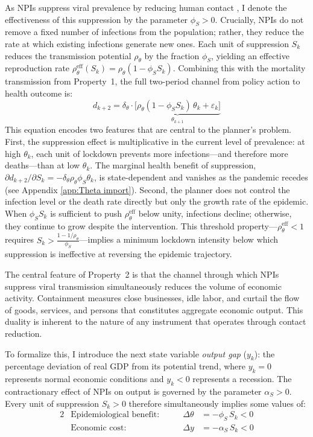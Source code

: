 \documentclass[12pt, a4paper]{article}
\newcommand{\Sk}{S_k}
\begin{document}
As NPIs suppress viral prevalence by reducing human contact \citep{Flaxman2020}, I denote the effectiveness of this suppression by the parameter $\phi_S > 0$. Crucially, NPIs do not remove a fixed number of infections from the population; rather, they reduce the rate at which existing infections generate new ones. Each unit of suppression $S_k$ reduces the transmission potential $\rho_\theta$ by the fraction $\phi_S$, yielding an effective reproduction rate $\rho_\theta^{\text{eff}}(S_k) = \rho_\theta(1 - \phi_S S_k)$. Combining this with the mortality transmission from Property~1, the full two-period channel from policy action to health outcome is:
%
\begin{equation}
    d_{k+2} = \delta_\theta \cdot \underbrace{\bigl[\rho_\theta (1 - \phi_S S_k) \, \theta_k + \varepsilon_k\bigr]}_{\theta_{k+1}} 
    \label{eq:excess dynamics}
\end{equation}
%
This equation encodes two features that are central to the planner's problem. First, the suppression effect is multiplicative in the current level of prevalence: at high $\theta_k$, each unit of lockdown prevents more infections---and therefore more deaths---than at low $\theta_k$. The marginal health benefit of suppression, $\partial d_{k+2} / \partial S_k = -\delta_\theta \rho_\theta \phi_S \theta_k$, is state-dependent and vanishes as the pandemic recedes (see Appendix \ref{app:Theta import}). Second, the planner does not control the infection level or the death rate directly but only the growth rate of the epidemic. When $\phi_S S_k$ is sufficient to push $\rho_\theta^{\text{eff}}$ below unity, infections decline; otherwise, they continue to grow despite the intervention. This threshold property---$\rho_\theta^{\text{eff}} < 1$ requires $S_k > \frac{1 - 1/\rho_\theta}{\phi_S}$---implies a minimum lockdown intensity below which suppression is ineffective at reversing the epidemic trajectory.

The central feature of Property~2 is that the channel through which NPIs suppress viral transmission simultaneously reduces the volume of economic activity. Containment measures close businesses, idle labor, and curtail the flow of goods, services, and persons that constitutes aggregate economic output. This duality is inherent to the nature of any instrument that operates through contact reduction.

To formalize this, I introduce the next state variable \textit{output gap} ($y_k$): the percentage deviation of real GDP from its potential trend, where $y_k = 0$ represents normal economic conditions and $y_k < 0$ represents a recession. The contractionary effect of NPIs on output is governed by the parameter $\alpha_S > 0$. Every unit of suppression $\Sk > 0$ therefore simultaneously implies some values of:
%
\begin{alignat}{2}
&\text{Epidemiological benefit:} &\qquad \Delta\theta &= -\phi_S \, \Sk < 0 \label{eq:S_health}\\[4pt]
&\text{Economic cost:} &\qquad \Delta y &= -\alpha_S \, \Sk < 0 \label{eq:S_econ}
\end{alignat}
%
\end{document}
